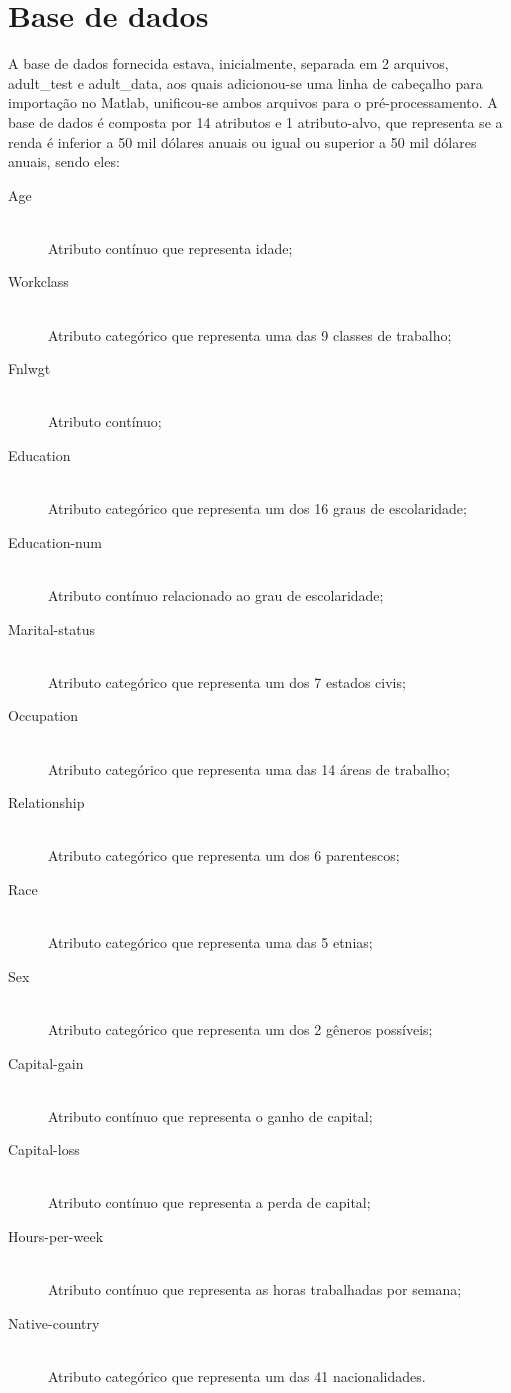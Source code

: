 \section{Base de dados}
A base de dados fornecida estava, inicialmente, separada em 2 arquivos, adult\_test e adult\_data, aos quais adicionou-se uma linha de cabeçalho para importação no Matlab, unificou-se ambos arquivos para o pré-processamento. A base de dados é composta por 14 atributos e 1 atributo-alvo, que representa se a renda é inferior a 50 mil dólares anuais ou igual ou superior a 50 mil dólares anuais, sendo eles:

\begin{description}
\item[Age] \hfill \\ Atributo contínuo que representa idade;
\item[Workclass] \hfill \\ Atributo categórico que representa uma das 9 classes de trabalho;
\item[Fnlwgt] \hfill \\ Atributo contínuo;
\item[Education] \hfill \\ Atributo categórico que representa um dos 16 graus de escolaridade;
\item[Education-num] \hfill \\ Atributo contínuo relacionado ao grau de escolaridade;
\item[Marital-status] \hfill \\ Atributo categórico que representa um dos 7 estados civis;
\item[Occupation] \hfill \\ Atributo categórico que representa uma das 14 áreas de trabalho;
\item[Relationship] \hfill \\ Atributo categórico que representa um dos 6 parentescos;
\item[Race] \hfill \\ Atributo categórico que representa uma das 5 etnias;
\item[Sex] \hfill \\ Atributo categórico que representa um dos 2 gêneros possíveis;
\item[Capital-gain] \hfill \\ Atributo contínuo que representa o ganho de capital;
\item[Capital-loss] \hfill \\ Atributo contínuo que representa a perda de capital;
\item[Hours-per-week] \hfill \\ Atributo contínuo que representa as horas trabalhadas por semana;
\item[Native-country] \hfill \\ Atributo categórico que representa um das 41 nacionalidades.
\end{description}

